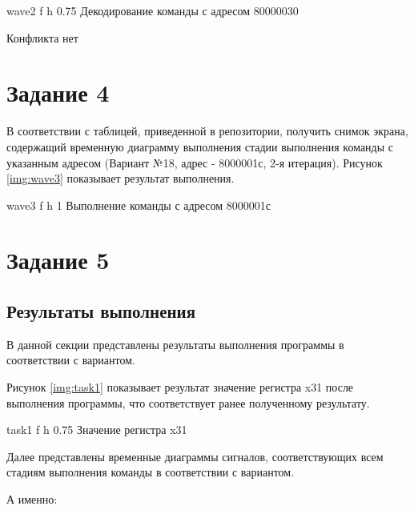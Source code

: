 {wave2} %
{f} %
{h} %
{0.75\textwidth} %
{Декодирование команды с адресом 80000030} %

Конфликта нет
\clearpage

\section{Задание 4}

В соответствии с таблицей, приведенной в репозитории, получить снимок экрана, содержащий
временную диаграмму выполнения стадии выполнения
команды с указанным адресом (Вариант №18, адрес - 8000001с, 2-я итерация).
Рисунок \ref{img:wave3} показывает результат выполнения.

{wave3} %
{f} %
{h} %
{1\textwidth} %
{Выполнение команды с адресом 8000001с} %
\clearpage

\section{Задание 5}

\subsection{Результаты выполнения}
В данной секции представлены результаты выполнения программы в соответствии с вариантом.

Рисунок \ref{img:task1} показывает результат значение регистра x31 после выполнения программы,
что соответствует ранее полученному результату.

{task1} %
{f} %
{h} %
{0.75\textwidth} %
{Значение регистра x31} %

Далее представлены временные диаграммы сигналов, соответствующих всем
стадиям выполнения команды в соответствии с вариантом.

А именно:

